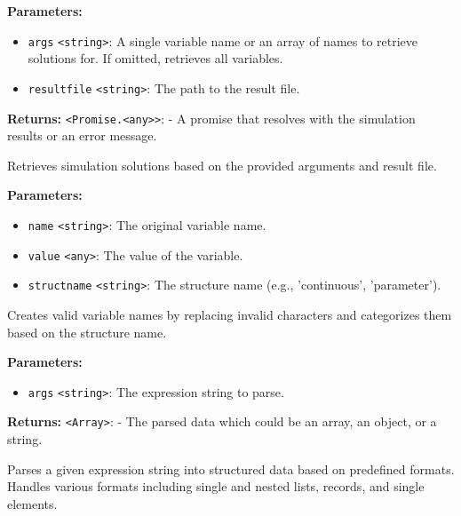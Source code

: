 \documentclass[12pt,a4paper]{article}
\begin{document}
\noindent \textbf{Parameters:}
\begin{itemize}
  \item \texttt{args} \texttt{<string>}: A single variable name or an array of names to retrieve solutions for. If omitted, retrieves all variables.
  \item \texttt{resultfile} \texttt{<string>}: The path to the result file.
\end{itemize}

\noindent \textbf{Returns:} \texttt{<Promise.<any>>}: - A promise that resolves with the simulation results or an error message.

\noindent Retrieves simulation solutions based on the provided arguments and result file.

\vspace{5mm}
\noindent {}


\noindent \textbf{Parameters:}
\begin{itemize}
  \item \texttt{name} \texttt{<string>}: The original variable name.
  \item \texttt{value} \texttt{<any>}: The value of the variable.
  \item \texttt{structname} \texttt{<string>}: The structure name (e.g., 'continuous', 'parameter').
\end{itemize}

\noindent Creates valid variable names by replacing invalid characters and categorizes them based on the structure name.

\vspace{5mm}
\noindent {}


\noindent \textbf{Parameters:}
\begin{itemize}
  \item \texttt{args} \texttt{<string>}: The expression string to parse.
\end{itemize}

\noindent \textbf{Returns:} \texttt{<Array>}: - The parsed data which could be an array, an object, or a string.

\noindent Parses a given expression string into structured data based on predefined formats.
Handles various formats including single and nested lists, records, and single elements.
\end{document}
